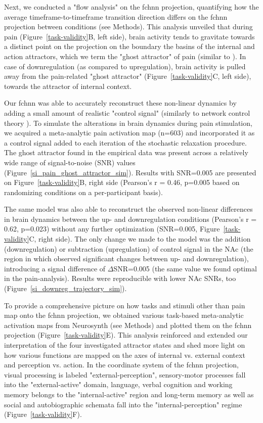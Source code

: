 \documentclass{article}
\begin{document}
Next, we conducted a "flow analysis" on the \acrshort{fchnn} projection, quantifying how the average timeframe-to-timeframe transition direction differs on the \acrshort{fchnn} projection between conditions (see Methods).
This analysis unveiled that during pain (Figure~\ref{task-validity}B, left side), brain activity tends to gravitate towards a distinct point on the projection on the boundary the basins of the internal and action attractors, which we term the "ghost attractor" of pain (similar to \cite{vohryzek2020ghost}). In case of downregulation (as compared to upregulation), brain activity is pulled away from the pain-related "ghost attractor" (Figure~\ref{task-validity}C, left side), towards the attractor of internal context.

Our \acrshort{fchnn} was able to accurately reconstruct these non-linear dynamics by adding a small amount of realistic "control signal" (similarly to network control theory \citet{liu2011controllability, gu2015controllability}). To simulate the alterations in brain dynamics during pain stimulation, we acquired a meta-analytic pain activation map \citep{zunhammer2021meta} (n=603) and incorporated it as a control signal added to each iteration of the stochastic relaxation procedure. The ghost attractor found in the empirical data was present across a relatively wide range of signal-to-noise (SNR) values (Figure~\ref{si_pain_ghost_attractor_sim}). Results with SNR=0.005 are presented on Figure~\ref{task-validity}B, right side (Pearson's r = 0.46, p=0.005 based on randomizing conditions on a per-participant basis).

The same model was also able to reconstruct the observed non-linear differences in brain dynamics between the up- and downregulation conditions (Pearson's r = 0.62, p=0.023) without any further optimization (SNR=0.005,
Figure~\ref{task-validity}C, right side). The only change we made to the model was the addition (downregulation) or
subtraction (upregulation) of control signal in the NAc (the region in which \citep{woo2015distinct} observed significant changes between up- and downregulation), introducing a signal difference of $\Delta$SNR=0.005 (the same value we found optimal in the pain-analysis). Results were reproducible with lower NAc SNRs, too (Figure~\ref{si_downreg_trajectory_sim}).

To provide a comprehensive picture on how tasks and stimuli other than pain map onto the \acrshort{fchnn} projection, we obtained various task-based meta-analytic activation maps from Neurosynth (see Methods) and plotted them on the \acrshort{fchnn} projection (Figure~\ref{task-validity}E). This analysis reinforced and extended our interpretation of the four investigated attractor states and shed more light on how various functions are mapped on the axes of internal vs. external context and perception vs. action.
In the coordinate system of the \acrshort{fchnn} projection, visual processing is labeled "external-perception", sensory-motor processes fall into the "external-active" domain, language, verbal cognition and working memory belongs to the "internal-active" region and long-term memory as well as social and autobiographic schemata fall into the "internal-perception" regime (Figure~\ref{task-validity}F).
\end{document}
